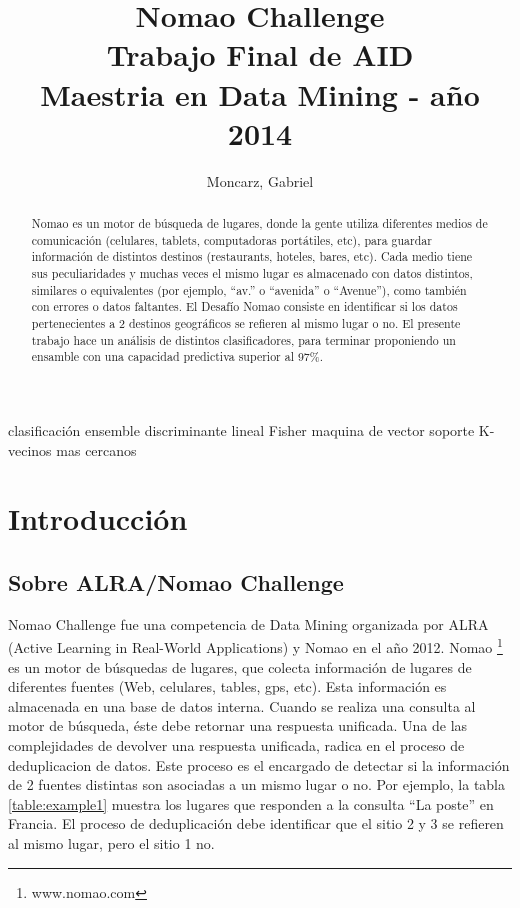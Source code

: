 \documentclass[journal]{IEEEtran}
\begin{document}
\title{  Nomao Challenge \\
	{\large Trabajo Final de AID} \\
	{\large Maestria en Data Mining - año 2014}
} 
\author{Moncarz, Gabriel}
\maketitle %


\begin{abstract}
Nomao es un motor de búsqueda de lugares, donde la gente utiliza diferentes medios
de comunicación (celulares, tablets, computadoras portátiles, etc), 
para guardar información de distintos destinos (restaurants, hoteles,
bares, etc). Cada medio tiene sus peculiaridades y muchas veces el mismo lugar
es almacenado con datos distintos, similares o equivalentes (por ejemplo, ``av.'' o
``avenida'' o ``Avenue''), como también con errores o datos faltantes. 
El Desafío Nomao consiste en identificar si los datos pertenecientes
a 2 destinos geográficos se refieren al mismo lugar o no. El presente
trabajo hace un análisis de distintos clasificadores, para terminar
proponiendo un ensamble con una capacidad predictiva superior al 97\%.
\end{abstract}

\begin{IEEEkeywords}
clasificación ensemble discriminante lineal Fisher maquina de vector soporte
K-vecinos mas cercanos
\end{IEEEkeywords}


\section{Introducción}

\subsection{Sobre ALRA/Nomao Challenge}
Nomao Challenge fue una competencia de Data Mining organizada por ALRA 
(Active Learning in Real-World Applications) y Nomao en el año 2012. Nomao 
\footnote{www.nomao.com} es un motor de búsquedas de lugares, que colecta
información de lugares de diferentes fuentes (Web, celulares, tables, gps, 
etc). Esta información es almacenada en una base de datos interna. 
Cuando se realiza una consulta al motor de búsqueda, éste debe retornar una
respuesta unificada. Una de las complejidades de devolver una
respuesta unificada, radica en el proceso de deduplicacion de datos. Este
proceso es el encargado de detectar si la información de 2 fuentes distintas
son asociadas a un mismo lugar o no. Por ejemplo, la tabla \ref{table:example1}
muestra los lugares que responden a la consulta ``La poste'' en Francia. El
proceso de deduplicación debe identificar que el sitio 2 y 3 se refieren
al mismo lugar, pero el sitio 1 no.
\end{document}
